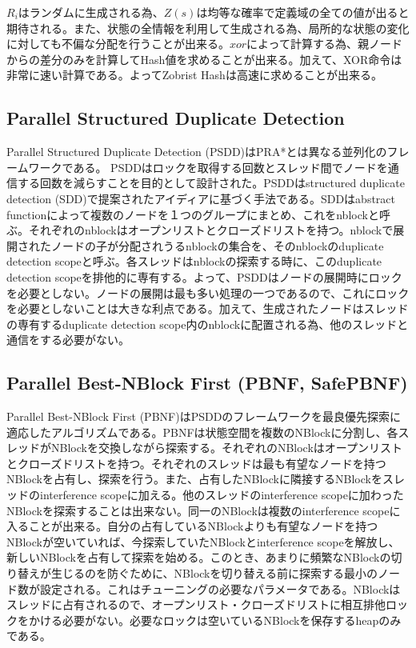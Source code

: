 \documentclass[uplatex]{jsarticle}
\begin{document}
$R_{i}$はランダムに生成される為、$Z(s)$は均等な確率で定義域の全ての値が出ると期待される。また、状態の全情報を利用して生成される為、局所的な状態の変化に対しても不偏な分配を行うことが出来る。$xor$によって計算する為、親ノードからの差分のみを計算してHash値を求めることが出来る。加えて、XOR命令は非常に速い計算である。よってZobrist Hashは高速に求めることが出来る。



\subsection{Parallel Structured Duplicate Detection}
Parallel Structured Duplicate Detection (PSDD)はPRA*とは異なる並列化のフレームワークである\cite{zhou2007parallel}。
PSDDはロックを取得する回数とスレッド間でノードを通信する回数を減らすことを目的として設計された。PSDDはstructured duplicate detection (SDD)で提案されたアイディアに基づく手法である\cite{zhou2004structured}。SDDはabstract functionによって複数のノードを１つのグループにまとめ、これをnblockと呼ぶ。それぞれのnblockはオープンリストとクローズドリストを持つ。nblockで展開されたノードの子が分配されうるnblockの集合を、そのnblockのduplicate detection scopeと呼ぶ。各スレッドはnblockの探索する時に、このduplicate detection scopeを排他的に専有する。よって、PSDDはノードの展開時にロックを必要としない。ノードの展開は最も多い処理の一つであるので、これにロックを必要としないことは大きな利点である。加えて、生成されたノードはスレッドの専有するduplicate detection scope内のnblockに配置される為、他のスレッドと通信をする必要がない。

\subsection{Parallel Best-NBlock First (PBNF, SafePBNF)}
Parallel Best-NBlock First (PBNF)はPSDDのフレームワークを最良優先探索に適応したアルゴリズムである。PBNFは状態空間を複数のNBlockに分割し、各スレッドがNBlockを交換しながら探索する\cite{Burns2010}。それぞれのNBlockはオープンリストとクローズドリストを持つ。それぞれのスレッドは最も有望なノードを持つNBlockを占有し、探索を行う。また、占有したNBlockに隣接するNBlockをスレッドのinterference scopeに加える。他のスレッドのinterference scopeに加わったNBlockを探索することは出来ない。同一のNBlockは複数のinterference scopeに入ることが出来る。自分の占有しているNBlockよりも有望なノードを持つNBlockが空いていれば、今探索していたNBlockとinterference scopeを解放し、新しいNBlockを占有して探索を始める。このとき、あまりに頻繁なNBlockの切り替えが生じるのを防ぐために、NBlockを切り替える前に探索する最小のノード数が設定される。これはチューニングの必要なパラメータである。NBlockはスレッドに占有されるので、オープンリスト・クローズドリストに相互排他ロックをかける必要がない。必要なロックは空いているNBlockを保存するheapのみである。
\newline
\end{document}
